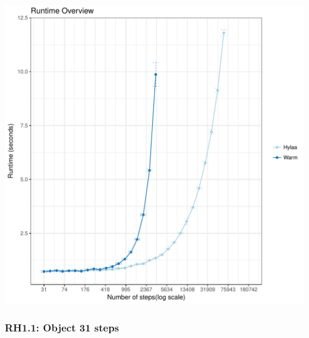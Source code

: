 \documentclass{article}\usepackage[]{graphicx}\usepackage[]{color}
\makeatletter
\def\maxwidth{ %
  \ifdim\Gin@nat@width>\linewidth
    \linewidth
  \else
    \Gin@nat@width
  \fi
}
\newenvironment{knitrout}{}{} %
\makeatother
\begin{document}
 
\begin{knitrout}
\color{fgcolor}
\includegraphics[width=\maxwidth]{figure/overview_RH1-1} 

\end{knitrout}
 	

\subsubsection{RH1.1: Object 31 steps}
\end{document}
